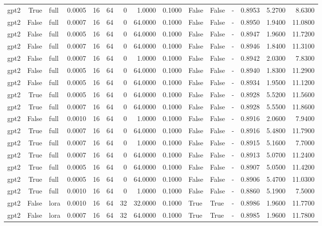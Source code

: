 \begin{tabular}{lrlrrrrrrlllrrr}
gpt2 & True & full & 0.0005 & 16 & 64 & 0 & 1.0000 & 0.1000 & False & False & - & 0.8953 & 5.2700 & 8.6300 \\
gpt2 & False & full & 0.0007 & 16 & 64 & 0 & 64.0000 & 0.1000 & False & False & - & 0.8950 & 1.9400 & 11.0800 \\
gpt2 & False & full & 0.0005 & 16 & 64 & 0 & 64.0000 & 0.1000 & False & False & - & 0.8947 & 1.9600 & 11.7200 \\
gpt2 & False & full & 0.0007 & 16 & 64 & 0 & 64.0000 & 0.1000 & False & False & - & 0.8946 & 1.8400 & 11.3100 \\
gpt2 & False & full & 0.0007 & 16 & 64 & 0 & 1.0000 & 0.1000 & False & False & - & 0.8942 & 2.0300 & 7.8300 \\
gpt2 & False & full & 0.0005 & 16 & 64 & 0 & 64.0000 & 0.1000 & False & False & - & 0.8940 & 1.8300 & 11.2900 \\
gpt2 & False & full & 0.0005 & 16 & 64 & 0 & 64.0000 & 0.1000 & False & False & - & 0.8934 & 1.9500 & 11.1200 \\
gpt2 & True & full & 0.0005 & 16 & 64 & 0 & 64.0000 & 0.1000 & False & False & - & 0.8928 & 5.5200 & 11.5600 \\
gpt2 & True & full & 0.0007 & 16 & 64 & 0 & 64.0000 & 0.1000 & False & False & - & 0.8928 & 5.5500 & 11.8600 \\
gpt2 & False & full & 0.0010 & 16 & 64 & 0 & 1.0000 & 0.1000 & False & False & - & 0.8916 & 2.0600 & 7.9400 \\
gpt2 & True & full & 0.0007 & 16 & 64 & 0 & 64.0000 & 0.1000 & False & False & - & 0.8916 & 5.4800 & 11.7900 \\
gpt2 & True & full & 0.0007 & 16 & 64 & 0 & 1.0000 & 0.1000 & False & False & - & 0.8915 & 5.1600 & 7.7000 \\
gpt2 & True & full & 0.0007 & 16 & 64 & 0 & 64.0000 & 0.1000 & False & False & - & 0.8913 & 5.0700 & 11.2400 \\
gpt2 & True & full & 0.0005 & 16 & 64 & 0 & 64.0000 & 0.1000 & False & False & - & 0.8907 & 5.0500 & 11.4200 \\
gpt2 & True & full & 0.0005 & 16 & 64 & 0 & 64.0000 & 0.1000 & False & False & - & 0.8906 & 5.4700 & 11.0300 \\
gpt2 & True & full & 0.0010 & 16 & 64 & 0 & 1.0000 & 0.1000 & False & False & - & 0.8860 & 5.1900 & 7.5000 \\
gpt2 & False & lora & 0.0010 & 16 & 64 & 32 & 32.0000 & 0.1000 & True & True & - & 0.8986 & 1.9600 & 11.7700 \\
gpt2 & False & lora & 0.0007 & 16 & 64 & 32 & 64.0000 & 0.1000 & True & True & - & 0.8985 & 1.9600 & 11.7800 \\

\end{tabular}
